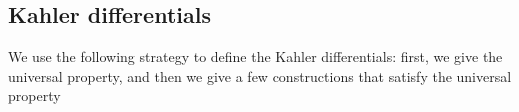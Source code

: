 
%
%			
%
%

\subsection{Kahler differentials}


\newcommand{\Der}{\operatorname{Der}}

We use the following strategy to define
the Kahler differentials:
first, we give the universal property, 
and then we give a few constructions that
satisfy the universal property

